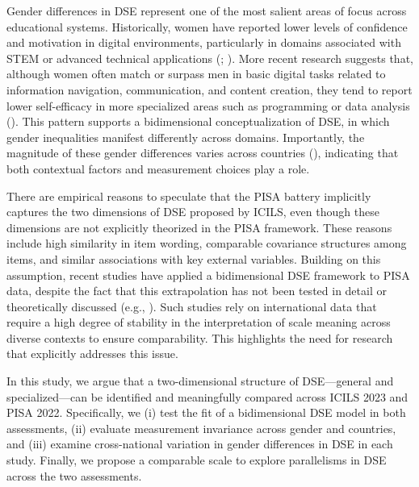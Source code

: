 \documentclass[
  letterpaper,
  DIV=11,
  numbers=noendperiod]{scrartcl}
\begin{document}
Gender differences in DSE represent one of the most salient areas of
focus across educational systems. Historically, women have reported
lower levels of confidence and motivation in digital environments,
particularly in domains associated with STEM or advanced technical
applications (;
).
More recent research suggests that, although women often match or
surpass men in basic digital tasks related to information navigation,
communication, and content creation, they tend to report lower
self-efficacy in more specialized areas such as programming or data
analysis ().
This pattern supports a bidimensional conceptualization of DSE, in which
gender inequalities manifest differently across domains. Importantly,
the magnitude of these gender differences varies across countries
(),
indicating that both contextual factors and measurement choices play a
role.

There are empirical reasons to speculate that the PISA battery
implicitly captures the two dimensions of DSE proposed by ICILS, even
though these dimensions are not explicitly theorized in the PISA
framework. These reasons include high similarity in item wording,
comparable covariance structures among items, and similar associations
with key external variables. Building on this assumption, recent studies
have applied a bidimensional DSE framework to PISA data, despite the
fact that this extrapolation has not been tested in detail or
theoretically discussed (e.g.,
). Such
studies rely on international data that require a high degree of
stability in the interpretation of scale meaning across diverse contexts
to ensure comparability. This highlights the need for research that
explicitly addresses this issue.

In this study, we argue that a two-dimensional structure of
DSE---general and specialized---can be identified and meaningfully
compared across ICILS 2023 and PISA 2022. Specifically, we (i) test the
fit of a bidimensional DSE model in both assessments, (ii) evaluate
measurement invariance across gender and countries, and (iii) examine
cross-national variation in gender differences in DSE in each study.
Finally, we propose a comparable scale to explore parallelisms in DSE
across the two assessments.
\end{document}
